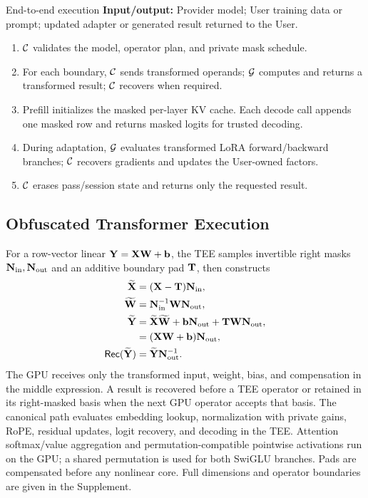 \begin{methodalgorithm}{End-to-end execution}
\label{alg:method-lifecycle}
\textbf{Input/output:} Provider model; User training data or prompt; updated
adapter or generated result returned to the User.\par
\begin{enumerate}
\setlength{\itemsep}{0pt}\setlength{\parskip}{0pt}\setlength{\parsep}{0pt}
\item $\mathcal{C}$ validates the model, operator plan, and private mask schedule.
\item For each boundary, $\mathcal{C}$ sends transformed operands; $\mathcal{G}$ computes
and returns a transformed result; $\mathcal{C}$ recovers when required.
\item Prefill initializes the masked per-layer KV cache. Each decode call
appends one masked row and returns masked logits for trusted decoding.
\item During adaptation, $\mathcal{G}$ evaluates transformed LoRA forward/backward
branches; $\mathcal{C}$ recovers gradients and updates the User-owned factors.
\item $\mathcal{C}$ erases pass/session state and returns only the requested result.
\end{enumerate}
\end{methodalgorithm}

\subsection{Obfuscated Transformer Execution}
\label{subsec:linear-execution}

For a row-vector linear $\mathbf{Y}=\mathbf{X}\mathbf{W}+\mathbf{b}$, the TEE samples invertible right
masks $\mathbf{N}_{\mathrm{in}},\mathbf{N}_{\mathrm{out}}$ and an additive boundary pad $\mathbf{T}$, then constructs
\begin{align}
\widetilde{\mathbf{X}}&=(\mathbf{X}-\mathbf{T})\mathbf{N}_{\mathrm{in}},\nonumber\\
\widetilde{\mathbf{W}}&=\mathbf{N}_{\mathrm{in}}^{-1}\mathbf{W}\mathbf{N}_{\mathrm{out}},\nonumber\\
\widetilde{\mathbf{Y}}&=\widetilde{\mathbf{X}}\widetilde{\mathbf{W}}+\mathbf{b}\mathbf{N}_{\mathrm{out}}+\mathbf{T}\mathbf{W}\mathbf{N}_{\mathrm{out}},\nonumber\\
   &=(\mathbf{X}\mathbf{W}+\mathbf{b})\mathbf{N}_{\mathrm{out}},\nonumber\\
\mathsf{Rec}(\widetilde{\mathbf{Y}})&=\widetilde{\mathbf{Y}}\mathbf{N}_{\mathrm{out}}^{-1}.
\label{eq:method-linear}
\end{align}
The GPU receives only the transformed input, weight, bias, and compensation in
the middle expression. A result is recovered before a TEE operator or retained
in its right-masked basis when the next GPU operator accepts that basis. The
canonical path evaluates embedding lookup, normalization with private gains,
RoPE, residual updates, logit recovery, and decoding in the TEE. Attention
softmax/value aggregation and permutation-compatible pointwise activations run
on the GPU; a shared permutation is used for both SwiGLU branches. Pads are
compensated before any nonlinear core. Full dimensions and operator boundaries
are given in the Supplement.

